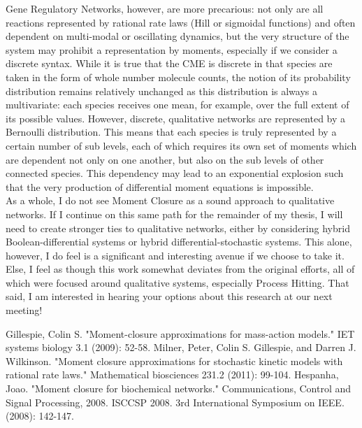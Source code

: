 \documentclass[a4paper,10pt]{article}
\begin{document}
Gene Regulatory Networks, however, are more precarious: not only are all reactions represented by rational rate laws (Hill or sigmoidal functions) and often dependent on multi-modal or oscillating dynamics, but the very structure of the system may prohibit a representation by moments, especially if we consider a discrete syntax. While it is true that the CME is discrete in that species are taken in the form of whole number molecule counts, the notion of its probability distribution remains relatively unchanged as this distribution is always a multivariate: each species receives one mean, for example, over the full extent of its possible values. However, discrete, qualitative networks are represented by a Bernoulli distribution. This means that each species is truly represented by a certain number of sub levels, each of which requires its own set of moments which are dependent not only on one another, but also on the sub levels of other connected species. This dependency may lead to an exponential explosion such that the very production of differential moment equations is impossible. \\

As a whole, I do not see Moment Closure as a sound approach to qualitative networks. If I continue on this same path for the remainder of my thesis, I will need to create stronger ties to qualitative networks, either by considering hybrid Boolean-differential systems or hybrid differential-stochastic systems. This alone, however, I do feel is a significant and interesting avenue if we choose to take it. Else, I feel as though this work somewhat deviates from the original efforts, all of which were focused around qualitative systems, especially Process Hitting. That said, I am interested in hearing your options about this research at our next meeting!

 \begin{thebibliography}{}
 	Gillespie, Colin S. "Moment-closure approximations for mass-action models." IET systems biology 3.1 (2009): 52-58.
 Milner, Peter, Colin S. Gillespie, and Darren J. Wilkinson. "Moment closure approximations for stochastic kinetic models with rational rate laws." Mathematical biosciences 231.2 (2011): 99-104.
 Hespanha, Joao. "Moment closure for biochemical networks." Communications, Control and Signal Processing, 2008. ISCCSP 2008. 3rd International Symposium on IEEE. (2008): 142-147.
\end{thebibliography}
 
 
\end{document}
